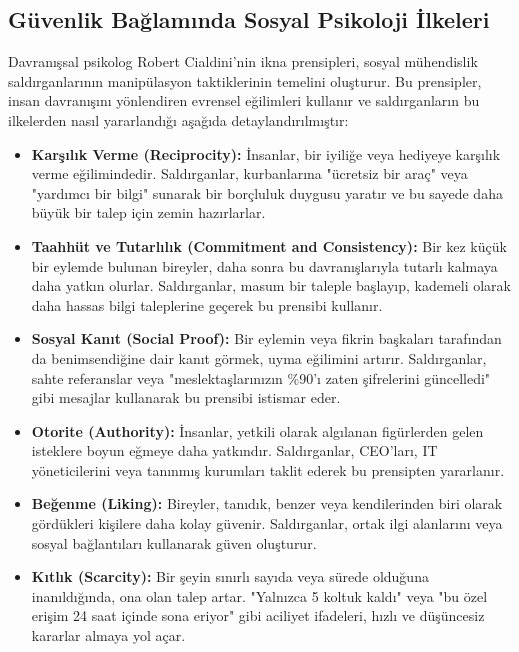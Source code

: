\subsection{Güvenlik Bağlamında Sosyal Psikoloji İlkeleri}

Davranışsal psikolog Robert Cialdini'nin ikna prensipleri, sosyal mühendislik saldırganlarının manipülasyon taktiklerinin temelini oluşturur. Bu prensipler, insan davranışını yönlendiren evrensel eğilimleri kullanır ve saldırganların bu ilkelerden nasıl yararlandığı aşağıda detaylandırılmıştır:

\begin{itemize}
    \item \textbf{Karşılık Verme (Reciprocity):} İnsanlar, bir iyiliğe veya hediyeye karşılık verme eğilimindedir. Saldırganlar, kurbanlarına "ücretsiz bir araç" veya "yardımcı bir bilgi" sunarak bir borçluluk duygusu yaratır ve bu sayede daha büyük bir talep için zemin hazırlarlar.
    \item \textbf{Taahhüt ve Tutarlılık (Commitment and Consistency):} Bir kez küçük bir eylemde bulunan bireyler, daha sonra bu davranışlarıyla tutarlı kalmaya daha yatkın olurlar. Saldırganlar, masum bir taleple başlayıp, kademeli olarak daha hassas bilgi taleplerine geçerek bu prensibi kullanır.
    \item \textbf{Sosyal Kanıt (Social Proof):} Bir eylemin veya fikrin başkaları tarafından da benimsendiğine dair kanıt görmek, uyma eğilimini artırır. Saldırganlar, sahte referanslar veya "meslektaşlarınızın \%90'ı zaten şifrelerini güncelledi" gibi mesajlar kullanarak bu prensibi istismar eder.
    \item \textbf{Otorite (Authority):} İnsanlar, yetkili olarak algılanan figürlerden gelen isteklere boyun eğmeye daha yatkındır. Saldırganlar, CEO'ları, IT yöneticilerini veya tanınmış kurumları taklit ederek bu prensipten yararlanır.
    \item \textbf{Beğenme (Liking):} Bireyler, tanıdık, benzer veya kendilerinden biri olarak gördükleri kişilere daha kolay güvenir. Saldırganlar, ortak ilgi alanlarını veya sosyal bağlantıları kullanarak güven oluşturur.
    \item \textbf{Kıtlık (Scarcity):} Bir şeyin sınırlı sayıda veya sürede olduğuna inanıldığında, ona olan talep artar. "Yalnızca 5 koltuk kaldı" veya "bu özel erişim 24 saat içinde sona eriyor" gibi aciliyet ifadeleri, hızlı ve düşüncesiz kararlar almaya yol açar.
\end{itemize}

